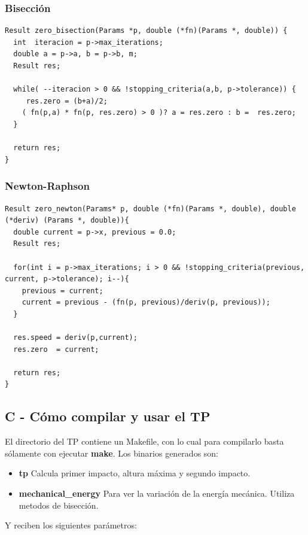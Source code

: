 \documentclass[a4paper]{article}
\begin{document}
\subsubsection{Bisección}
\begin{verbatim}
Result zero_bisection(Params *p, double (*fn)(Params *, double)) {
  int  iteracion = p->max_iterations;
  double a = p->a, b = p->b, m;
  Result res;

  while( --iteracion > 0 && !stopping_criteria(a,b, p->tolerance)) {
     res.zero = (b+a)/2;
    ( fn(p,a) * fn(p, res.zero) > 0 )? a = res.zero : b =  res.zero;
  }

  return res;
}
\end{verbatim}


\subsubsection{Newton-Raphson}
\begin{verbatim}
Result zero_newton(Params* p, double (*fn)(Params *, double), double (*deriv) (Params *, double)){
  double current = p->x, previous = 0.0;
  Result res;

  for(int i = p->max_iterations; i > 0 && !stopping_criteria(previous, current, p->tolerance); i--){
    previous = current;
    current = previous - (fn(p, previous)/deriv(p, previous));
  }

  res.speed = deriv(p,current);
  res.zero  = current;

  return res;
}
\end{verbatim}

\newpage

\subsection{C - Cómo compilar y usar el TP}
El directorio del TP contiene un Makefile, con lo cual para compilarlo basta sólamente con ejecutar \textbf{make}. Los binarios generados son: 

\begin{itemize}
  \item \textbf{tp} Calcula primer impacto, altura máxima y segundo impacto.
  \item \textbf{mechanical\_energy} Para ver la variación de la energía mecánica. Utiliza metodos de bisección.
\end{itemize}

Y reciben los siguientes parámetros:
\end{document}

